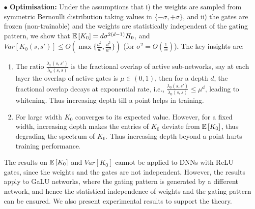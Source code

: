 \documentclass{article}
\begin{document}
\begin{comment} We make use of the framework of DGNs in order to obtain insights related to Questions I and II. In particular, we study various networks namely i) deep linear networks (DLN) where all the gating values are always $1$,  ii) DGNs with fixed random activation, wherein the gating values corresponding to an input example is sampled at random and held fixed during training iii) gated linear networks \cite{}, wherein, the gating pattern for an input is in turn derived from a separate network of similar architecture, iv) networks with frozen gates, wherein, the gating value is constant through training, v) networks with adaptable gates, wherein, the gating values change during training.
\end{comment}

$\bullet$ \textbf{Optimisation:} Under the assumptions that i) the weights are sampled from symmetric Bernoulli distribution taking values in $\{-\sigma,+\sigma\}$, and ii) the gates are frozen (non-trainable) and the weights are statistically independent of the gating pattern, we show that $\mathbb{E}\left[K_0\right]=d\sigma^{2(d-1)}H_0$, and $Var\left[K_0(s,s')\right]\leq O(\max\{\frac{d^2}{w}, \frac{d^3}{w^2}\})$ (for $\sigma^2=O(\frac{1}w)$). The key insights are:
\begin{enumerate}
\item The ratio $\frac{{\lambda_0}(s,s')}{{\lambda_0}(s,s)}$ is the fractional overlap of active sub-networks, say at each layer the overlap of active gates is $\mu\in (0,1)$, then for a depth $d$, the fractional overlap decays at exponential rate, i.e., $\frac{{\lambda_0}(s,s')}{{\lambda_0}(s,s)}\leq \mu^d$, leading to whitening. Thus increasing depth till a point helps in training.
\item For large width $K_0$ converges to its expected value. However, for a fixed width, increasing depth makes the entries of $K_0$ deviate from $\mathbb{E}\left[K_0\right]$, thus degrading the spectrum of $K_0$. Thus increasing depth beyond a point hurts training performance.
\end{enumerate}
The results on $\mathbb{E}\left[K_0\right]$ and $Var\left[K_0\right]$ cannot be applied to DNNs with ReLU gates, since the weights and the gates are not independent. However, the results apply to GaLU networks, where the gating pattern is generated by a different network, and hence the statistical independence of weights and the gating pattern can be ensured. We also present experimental results to support the theory.
\end{document}
